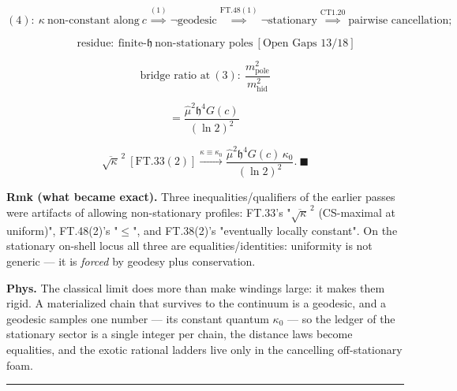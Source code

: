 \begin{theorem}
\[
(4):\ \kappa\ \text{non-constant along}\ c\overset{(1)}{\implies}\neg\text{geodesic}\overset{\mathrm{FT.48}(1)}{\implies}\neg\text{stationary}\overset{\mathrm{CT1.20}}{\implies}\text{pairwise cancellation};
\]

\[
\qquad \text{residue}:\ \text{finite-}\mathfrak h\ \text{non-stationary poles}\ [\text{Open Gaps 13}/18]
\]

\[
\text{bridge ratio at}\ (3):\ \frac{m_{\mathrm{pole}}^2}{m_{\mathrm{hid}}^2}
\]

\[
= \frac{\hat\mu^2\mathfrak h^4G(c)}{(\ln2)^2}\,
\]

\[
\overline{\sqrt\kappa}^{\,2}\ [\mathrm{FT.33}(2)]\xrightarrow{\kappa\equiv\kappa_0}\frac{\hat\mu^2\mathfrak h^4G(c)\,\kappa_0}{(\ln2)^2}.\ \blacksquare
\]

\textbf{Rmk (what became exact).} Three inequalities/qualifiers of the earlier passes were artifacts of allowing non-stationary profiles: FT.33's "$\overline{\sqrt\kappa}^{\,2}$ (CS-maximal at uniform)", FT.48(2)'s "$\le$", and FT.38(2)'s "eventually locally constant". On the stationary on-shell locus all three are equalities/identities: uniformity is not generic — it is \textit{forced} by geodesy plus conservation.

\textbf{Phys.} The classical limit does more than make windings large: it makes them rigid. A materialized chain that survives to the continuum is a geodesic, and a geodesic samples one number — its constant quantum $\kappa_0$ — so the ledger of the stationary sector is a single integer per chain, the distance laws become equalities, and the exotic rational ladders live only in the cancelling off-stationary foam.

\vspace{2pt}\noindent\rule{\textwidth}{0.4pt}\vspace{2pt}

\end{theorem}

